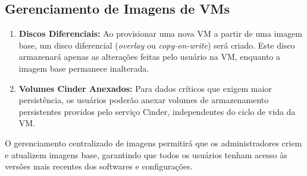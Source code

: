 \subsection{Gerenciamento de Imagens de VMs}

\begin{enumerate}
 \item \textbf{Discos Diferenciais:} Ao provisionar uma nova VM a partir de uma imagem base, um disco diferencial (\textit{overlay} ou \textit{copy-on-write}) será criado. Este disco armazenará apenas as alterações feitas pelo usuário na VM, enquanto a imagem base permanece inalterada.
 \item \textbf{Volumes Cinder Anexados:} Para dados críticos que exigem maior persistência, os usuários poderão anexar volumes de armazenamento persistentes providos pelo serviço Cinder, independentes do ciclo de vida da VM.
\end{enumerate}

O gerenciamento centralizado de imagens permitirá que os administradores criem e atualizem imagens base, garantindo que todos os usuários tenham acesso às versões mais recentes dos softwares e configurações.